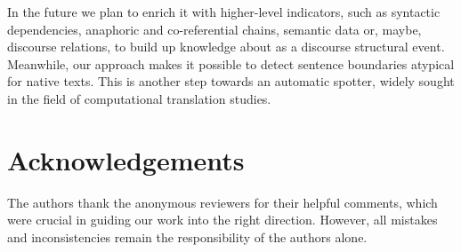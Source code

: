 \documentclass[output=paper]{langsci/langscibook.cls}
\begin{document}
In the future we plan to enrich it with higher-level indicators, such as syntactic dependencies, anaphoric and co-referential chains, semantic data or, maybe, discourse relations, to build up knowledge about  as a discourse structural event. Meanwhile, our approach makes it possible to detect sentence boundaries atypical for native texts. This is another step towards an automatic  spotter, widely sought in the field of computational translation studies.

\section{Acknowledgements}
The authors thank the anonymous reviewers for their helpful comments, which were crucial in guiding our work into the right direction. However, all mistakes and inconsistencies remain the responsibility of the authors alone.
 {\sloppy
 \printbibliography[heading=subbibliography,notkeyword=this] 
 }
\end{document}
